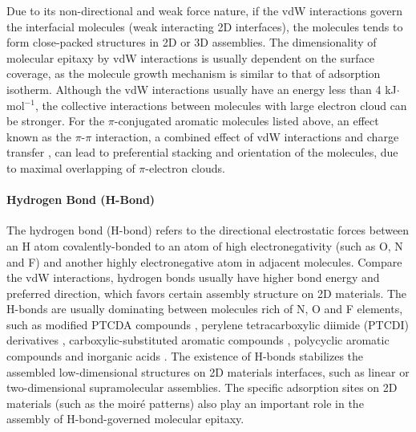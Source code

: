 Due to its non-directional and weak force nature, if the vdW
interactions govern the interfacial molecules (weak interacting 2D
interfaces), the molecules tends to form close-packed structures in 2D
or 3D assemblies. The dimensionality of molecular epitaxy by vdW
interactions is usually dependent on the surface coverage, as the
molecule growth mechanism is similar to that of adsorption
isotherm. Although the vdW interactions usually have an energy less than
4 kJ\(\cdot\)mol\(^{-1}\), the collective interactions between molecules
with large electron cloud can be stronger. For the \(\pi\)-conjugated
aromatic molecules listed above, an effect known as the \(\pi\)-\(\pi\)
interaction, a combined effect of vdW interactions and charge
transfer \cite{Hunter_1990_pi}, can lead to preferential stacking and
orientation of the molecules, due to maximal overlapping of
\(\pi\)-electron clouds. 


\paragraph{Hydrogen Bond (H-Bond)}

The hydrogen bond (H-bond) refers to the directional electrostatic
forces between an H atom covalently-bonded to an atom of high
electro\-negativity (such as O, N and F) and another highly
electro\-negative atom in adjacent molecules. Compare the vdW
interactions, hydrogen bonds usually have higher bond energy and
preferred direction, which favors certain assembly structure on 2D
materials. The H-bonds are usually dominating between molecules rich
of N, O and F elements, such as modified PTCDA compounds
\cite{Mura_2010_DFT_H_bond_PTCDA_gr,Karmel_2014_assembl_hetero_gr},
perylene tetra\-carboxylic diimide (PTCDI) derivatives
\cite{Pollard_2010_hbond_assembly_gr,Karmel_2014_PTCDI_gr},
carboxylic-substituted aromatic compounds
\cite{Rochefort_2009_aro_graphene_mech,Addou_2013_TPA_gr}, polycyclic
aromatic compounds
\cite{Kozlov_2012_polyaro_gr,Roos_2011_BTP_gr,Meier_2010_polycyclic_gr}
and inorganic acids \cite{Prado_2011_2D_acid_gr}. The existence of
H-bonds stabilizes the assembled low-dimensional structures on 2D
materials interfaces, such as linear
\cite{Pollard_2010_hbond_assembly_gr} or two-dimensional
\cite{Prado_2011_2D_acid_gr} supra\-molecular assemblies. The specific
adsorption sites on 2D materials (such as the moiré patterns) also
play an important role in the assembly of H-bond-governed molecular
epitaxy.


